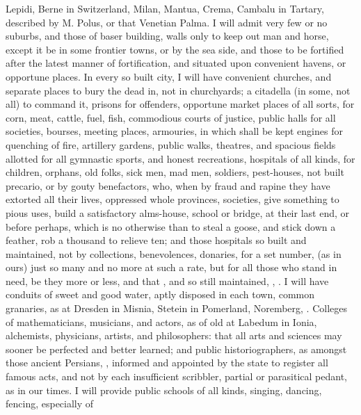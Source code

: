 {Lepidi, Berne in Switzerland, Milan, Mantua, Crema, Cambalu in Tartary,
described by M. Polus, or that Venetian Palma. I will admit very few or
no suburbs, and those of baser building, walls only to keep out man and
horse, except it be in some frontier towns, or by the sea side, and
those to be fortified  after the latest manner of fortification,
and situated upon convenient havens, or opportune places. In every so
built city, I will have convenient churches, and separate places to
bury the dead in, not in churchyards; a citadella (in some, not all) to
command it, prisons for offenders, opportune market places of all
sorts, for corn, meat, cattle, fuel, fish, commodious courts of
justice, public halls for all societies, bourses, meeting places,
armouries, in which shall be kept engines for quenching of fire,
artillery gardens, public walks, theatres, and spacious fields allotted
for all gymnastic sports, and honest recreations, hospitals of all
kinds, for children, orphans, old folks, sick men, mad men, soldiers,
pest-houses, \etc{} not built precario, or by gouty benefactors, who, when
by fraud and rapine they have extorted all their lives, oppressed whole
provinces, societies, \etc{} give something to pious uses, build a
satisfactory alms-house, school or bridge, \etc{} at their last end, or
before perhaps, which is no otherwise than to steal a goose, and stick
down a feather, rob a thousand to relieve ten; and those hospitals so
built and maintained, not by collections, benevolences, donaries, for a
set number, (as in ours) just so many and no more at such a rate, but
for all those who stand in need, be they more or less, and that , and so still maintained, ,
\etc{}. I will have conduits of sweet and good water, aptly disposed in
each town, common  granaries, as at Dresden in Misnia, Stetein in
Pomerland, Noremberg, \etc{}. Colleges of mathematicians, musicians, and
actors, as of old at Labedum in Ionia, alchemists, physicians,
artists, and philosophers: that all arts and sciences may sooner be
perfected and better learned; and public historiographers, as amongst
those ancient Persians, , informed and appointed by the state to
register all famous acts, and not by each insufficient scribbler,
partial or parasitical pedant, as in our times. I will provide public
schools of all kinds, singing, dancing, fencing, \etc{} especially of
}
